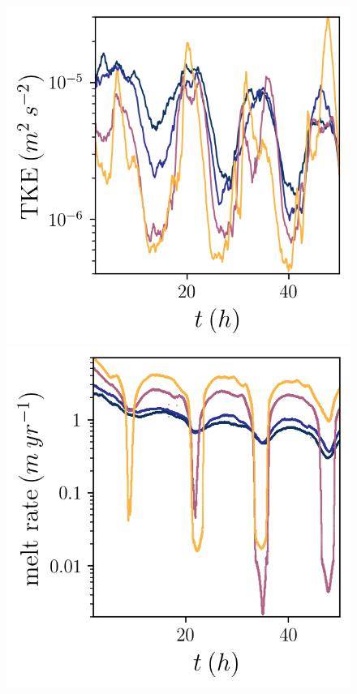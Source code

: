 \documentclass[draft]{agujournal2019}
\begin{document}
\begin{figure}[h!]
    \centering
    \begin{minipage}{0.33\textwidth}
        \includegraphics[trim={0 0 0 0},clip,width=\textwidth]{Figures/tke_cmp_dT_t.png}
    \end{minipage}%
    \begin{minipage}{0.33\textwidth}
        \includegraphics[trim={0 0 0 0},clip,width=\textwidth]{Figures/melt_cmp_dT_t.png}

\end{minipage}
\end{figure}
\end{document}
